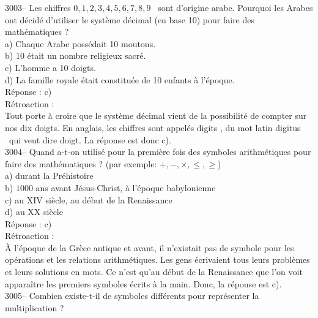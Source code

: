 \documentclass[letterpaper, 12pt]{article}
\begin{document}
3003-- Les chiffres \og $0, 1, 2, 3, 4, 5, 6, 7, 8, 9$ \fg \ sont d'origine arabe. Pourquoi les Arabes ont d\'ecid\'e d'utiliser le syst\`eme d\'ecimal (en base 10) pour faire des math\'ematiques ?\\

a) Chaque Arabe poss\'edait 10 moutons.\\
b) 10 \'etait un nombre religieux sacr\'e.\\
c) L'homme a 10 doigts.\\
d) La famille royale \'etait constitu\'ee de 10 enfants \`a l'\'epoque.\\

R\'eponse : c)\\

R\'etroaction :\\
Tout porte \`a croire que le syst\`eme d\'ecimal vient de la possibilit\'e de compter sur nos dix doigts. En anglais, les chiffres sont appel\'es \og digits \fg, du mot latin \og digitus \fg \ qui veut dire doigt. La r\'eponse est donc c).\\



3004-- Quand a-t-on utilis\'e pour la premi\`ere fois des symboles arithm\'etiques pour faire des math\'ematiques ? (par exemple: $+, -, \times , \leq , \geq $)\\

a) durant la Pr\'ehistoire\\
b) $1000$ ans avant J\'esus-Christ, \`a l'\'epoque babylonienne\\
c) au {\scriptsize XIV\ieme{}} si\`ecle, au d\'ebut de la Renaissance\\
d) au {\scriptsize XX\ieme{}} si\`ecle\\

R\'eponse : c)\\

R\'etroaction :\\
\`A l'\'epoque de la Gr\`ece antique et avant, il n'existait pas de symbole pour les op\'erations et les relations arithm\'etiques. Les gens \'ecrivaient tous leurs probl\`emes et leurs solutions en mots. Ce n'est qu'au d\'ebut de la Renaissance que l'on voit appara\^itre les premiers symboles \'ecrits \`a la main. Donc, la r\'eponse est c).\\



3005-- Combien existe-t-il de symboles diff\'erents pour repr\'esenter la multiplication ?\\
\end{document}
